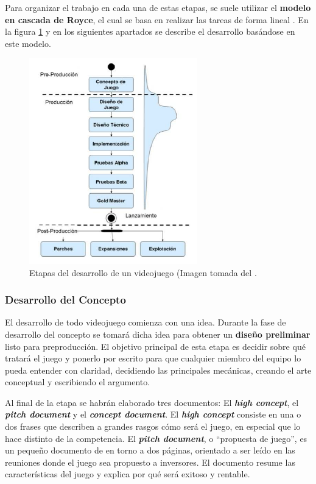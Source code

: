 Para organizar el trabajo en cada una de estas etapas, se suele utilizar el \textbf{modelo en cascada de Royce}, el cual se basa en realizar las tareas de forma lineal \cite{libro_esi}. En la figura \ref{etapas-desarrollo} y en los siguientes apartados se describe el desarrollo basándose en este modelo. 
\begin{figure}[!t]
    \centering
    \includegraphics[width=0.65\textwidth]{images/estadodelarte/desarrollo/etapas-desarrollo}
    \caption{Etapas del desarrollo de un videojuego (Imagen tomada del \cite{libro_esi}.}
    \label{etapas-desarrollo}
\end{figure}

\subsubsection{Desarrollo del Concepto}
El desarrollo de todo videojuego comienza con una idea. Durante la fase de desarrollo del concepto se tomará dicha idea para obtener un \textbf{diseño preliminar} listo para preproducción. El objetivo principal de esta etapa es decidir sobre qué tratará el juego y ponerlo por escrito para que cualquier miembro del equipo lo pueda entender con claridad, decidiendo las principales mecánicas, creando el arte conceptual y escribiendo el argumento\cite{game_design_2}. 

Al final de la etapa se habrán elaborado tres documentos: El \textbf{\textit{high concept}}, el \textbf{\textit{pitch document}} y el \textbf{\textit{concept document}}. El \textbf{\textit{high concept}} consiste en una o dos frases que describen a grandes rasgos cómo será el juego, en especial que lo hace distinto de la competencia. El \textbf{\textit{pitch document}}, o ``propuesta de juego'', es un pequeño documento de en torno a dos páginas, orientado a ser leído en las reuniones donde el juego sea propuesto a inversores. El documento resume las características del juego y explica por qué será exitoso y rentable.

